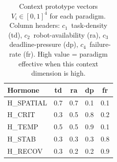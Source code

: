\begin{table}[t]
\centering
\caption{Context prototype vectors $V_i \in [0,1]^4$ for each paradigm.
Column headers: $c_1$~task-density (td), $c_2$~robot-availability (ra),
$c_3$~deadline-pressure (dp), $c_4$~failure-rate (fr).
High value = paradigm effective when this context dimension is high.}
\label{tab:hormones-proto}
\small
\setlength{\tabcolsep}{4pt}
\begin{tabular}{@{}lcccc@{}}
\toprule
\textbf{Hormone} & td & ra & dp & fr \\
\midrule
H\_SPATIAL & 0.7 & 0.7 & 0.1 & 0.1 \\
H\_CRIT    & 0.3 & 0.5 & 0.8 & 0.2 \\
H\_TEMP    & 0.5 & 0.5 & 0.9 & 0.1 \\
H\_STAB    & 0.3 & 0.3 & 0.3 & 0.8 \\
H\_RECOV   & 0.3 & 0.2 & 0.2 & 0.9 \\
\bottomrule
\end{tabular}
\end{table}
